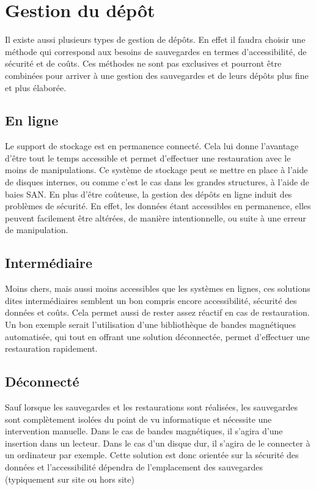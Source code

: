 \documentclass[a4paper,11pt]{report}
\begin{document}
\section{Gestion du dépôt}
Il existe aussi plusieurs types de gestion de dépôts. 
En effet il faudra choisir une méthode qui correspond aux besoins de sauvegardes en termes d'accessibilité, de sécurité et de coûts.
Ces méthodes ne sont pas exclusives et pourront être combinées pour arriver à une gestion des sauvegardes et de leurs dépôts plus fine et plus élaborée.

\subsection{En ligne}
Le support de stockage est en permanence connecté. Cela lui donne l'avantage d'être tout le temps accessible et permet d'effectuer une restauration avec le moins de manipulations.
Ce système de stockage peut se mettre en place à l'aide de disques internes, ou comme c'est le cas dans les grandes structures, à l'aide de baies SAN.
En plus d'être coûteuse, la gestion des dépôts en ligne induit des problèmes de sécurité. En effet, les données étant accessibles en permanence, elles peuvent facilement être altérées, de manière intentionnelle, ou suite à une erreur de manipulation.

\subsection{Intermédiaire}
Moins chers, mais aussi moins accessibles que les systèmes en lignes, ces solutions dites intermédiaires semblent un bon compris encore accessibilité, sécurité des données et coûts.
Cela permet aussi de rester assez réactif en cas de restauration.
Un bon exemple serait l'utilisation d'une bibliothèque de bandes magnétiques automatisée, qui tout en offrant une solution déconnectée, permet d'effectuer une restauration rapidement.

\subsection{Déconnecté}
Sauf lorsque les sauvegardes et les restaurations sont réalisées, les sauvegardes sont complètement isolées du point de vu informatique et nécessite une intervention manuelle.
Dans le cas de bandes magnétiques, il s'agira d'une insertion dans un lecteur. Dans le cas d'un disque dur, il s'agira de le connecter à un ordinateur par exemple.
Cette solution est donc orientée sur la sécurité des données et l'accessibilité dépendra de l'emplacement des sauvegardes (typiquement sur site ou hors site) 
\end{document}
